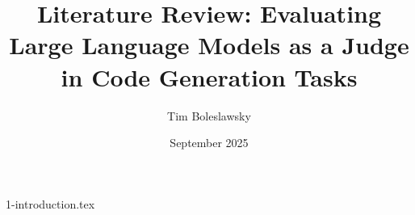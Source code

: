 \documentclass[conference]{IEEEtran}
\begin{document}
\thispagestyle{plain}
\pagestyle{plain}

\title{Literature Review: Evaluating Large Language Models as a Judge in Code Generation Tasks}
\author{Tim Boleslawsky}
\date{September 2025}

\maketitle

{1-introduction.tex}



\vspace{12pt}
\end{document}
